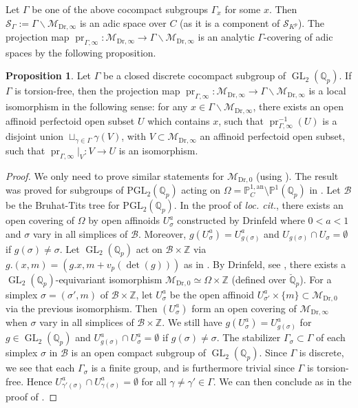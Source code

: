 \documentclass{article}
\theoremstyle{definition}
\newtheorem{proposition}[theorem]{Proposition}
\def\calM{\mathcal{M}}
\def\calS{\mathcal{S}}
\def\bbP{\mathbb{P}}
\def\bbQ{\mathbb{Q}}
\def\bbZ{\mathbb{Z}}
\def\bs{\backslash}
\DeclareMathOperator{\pr}{pr}
\DeclareMathOperator{\GL}{GL}
\def\Dr{\mathrm{Dr}}
\begin{document}
Let $\Gamma$ be one of the above cocompact subgroups $\Gamma_x$ for some $x$. Then $\calS_{\Gamma}:=\Gamma\bs\calM_{\Dr,\infty}$ is an adic space over $C$ (as it is a component of $\calS_{K^p}$). The projection map $\pr_{\Gamma,\infty}:\calM_{\Dr,\infty}\to\Gamma\bs\calM_{\Dr,\infty}$ is an analytic $\Gamma$-covering of adic spaces by the following proposition. 
\begin{proposition}\label{prop:prGamma}
Let $\Gamma$ be a closed discrete cocompact subgroup of $\GL_2(\bbQ_p)$. If $\Gamma$ is torsion-free, then the projection map $\pr_{\Gamma,\infty}:\calM_{\Dr,\infty}\to \Gamma\bs \calM_{\Dr,\infty}$ is a local isomorphism in the following sense: for any $x\in \Gamma\bs \calM_{\Dr,\infty}$, there exists an open affinoid perfectoid open subset $U$ which contains $x$, such that $\pr_{\Gamma,\infty}^{-1}(U)$ is a disjoint union $\sqcup_{\gamma\in\Gamma}\gamma(V)$, with $V\subset \calM_{\Dr,\infty}$ an affinoid perfectoid open subset, such that $\pr_{\Gamma,\infty}|_{V}:V\to U$ is an isomorphism.
\end{proposition}
\begin{proof}
   We only need to prove similar statements for $\calM_{\Dr,0}$ (using \cite[Proposition 4.2(ii)]{CDN20}). The result was proved for subgroups of $\mathrm{PGL}_2(\bbQ_p)$ acting on $\Omega=\bbP^{1,\mathrm{an}}_{C}\setminus \bbP^1(\bbQ_p)$ in \cite[\S 5, Theorem 2]{SS91}. Let $\mathcal{B}$ be the Bruhat-Tits tree for $\mathrm{PGL}_2(\bbQ_p)$. In the proof of \textit{loc. cit.}, there exists an open covering of $\Omega$ by open affinoids $U_{\sigma}^a$ constructed by Drinfeld where $0<a<1$ and $\sigma$ vary in all simplices of $\mathcal{B}$. Moreover, $g(U_{\sigma}^{a})=U_{g(\sigma)}^a$ and $U_{g(\sigma)}\cap U_{\sigma}=\emptyset$ if $g(\sigma)\neq \sigma$. Let $\GL_2(\bbQ_p)$ act on $\mathcal{B}\times \bbZ$ via $g.(x,m)=(g.x,m+v_{p}(\det(g)))$ as in \cite[\S 3.68]{RZ96}. By Drinfeld, see \cite[\S 3.71]{RZ96}, there exists a $\GL_2(\bbQ_p)$-equivariant isomorphism $\calM_{\Dr,0}\simeq \Omega\times\bbZ$ (defined over $\breve{\bbQ}_p$). For a simplex $\sigma=(\sigma',m)$ of $\mathcal{B}\times \bbZ$, let $U_{\sigma}^a$ be the open affinoid $U_{\sigma'}^a\times\{m\}\subset \calM_{\Dr,0}$ via the previous isomorphism. Then $(U_{\sigma}^a)$ form an open covering of $\calM_{\Dr,\infty}$ when $\sigma$ vary in all simplices of $\mathcal{B}\times\bbZ$. We still have $g(U_{\sigma}^{a})=U_{g(\sigma)}^a$ for $g\in\GL_2(\bbQ_p)$ and $U_{g(\sigma)}^a\cap U_{\sigma}^a=\emptyset$ if $g(\sigma)\neq \sigma$. The stabilizer $\Gamma_{\sigma}\subset \Gamma$ of each simplex $\sigma$ in $\mathcal{B}$ is an open compact subgroup of $\GL_2(\bbQ_p)$. Since $\Gamma$ is discrete, we see that each $\Gamma_{\sigma}$ is a finite group, and is furthermore trivial since $\Gamma$ is torsion-free. Hence $U_{\gamma'(\sigma)}^a\cap U_{\gamma(\sigma)}^a=\emptyset$ for all $\gamma\neq\gamma'\in\Gamma$. We can then conclude as in the proof of \cite[\S 5, Theorem 2]{SS91}.
\end{proof}
\end{document}
